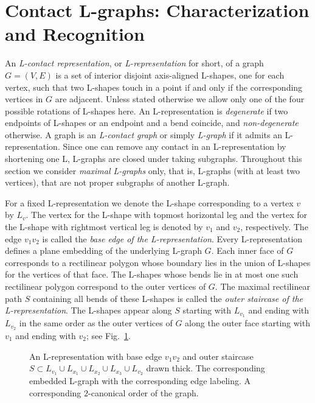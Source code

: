 \documentclass{llncs}
\begin{document}
\section{Contact L-graphs: Characterization and Recognition}\label{sec:characterization}

An \emph{L-contact representation}, or \emph{L-representation} for short, of a graph $G = (V,E)$ is a set of interior disjoint axis-aligned L-shapes, one for each vertex, such that two L-shapes touch in a point if and only if the corresponding vertices in $G$ are adjacent. Unless stated otherwise we allow only one of the four possible rotations of L-shapes here. An L-representation is \emph{degenerate} if two endpoints of L-shapes or an endpoint and a bend coincide, and \emph{non-degenerate} otherwise. A graph is an \emph{L-contact graph} or simply \emph{L-graph} if it admits an L-representation. Since one can remove any contact in an L-representation by shortening one L, L-graphs are closed under taking subgraphs. Throughout this section we consider \emph{maximal L-graphs} only, that is, L-graphs (with at least two vertices), that are not proper subgraphs of another L-graph.

For a fixed L-representation we denote the L-shape corresponding to a vertex $v$ by $L_v$. The vertex for the L-shape with topmost horizontal leg and the vertex for the L-shape with rightmost vertical leg is denoted by $v_1$ and $v_2$, respectively. The edge $v_1v_2$ is called the \emph{base edge of the L-representation}. Every L-representation defines a plane embedding of the underlying L-graph $G$. Each inner face of $G$ corresponds to a rectilinear polygon whose boundary lies in the union of L-shapes for the vertices of that face. 
The L-shapes whose bends lie in at most one such rectilinear polygon correspond to the outer vertices of $G$. The maximal rectilinear path $S$ containing all bends of these L-shapes is called the \emph{outer staircase of the L-representation}. The L-shapes appear along $S$ starting with $L_{v_1}$ and ending with $L_{v_2}$ in the same order as the outer vertices of $G$ along the outer face starting with $v_1$ and ending with $v_2$; see Fig.~\ref{fig:example}.



\begin{figure}[t!]
\centering
 \caption{ An L-representation with base edge $v_1v_2$ and outer staircase $S \subset L_{v_1} \cup L_{x_1} \cup L_{x_2} \cup L_{x_3} \cup L_{v_2}$ drawn thick.  The corresponding embedded L-graph with the corresponding edge labeling.  A corresponding $2$-canonical order of the graph.}
 \label{fig:example}
\end{figure}
\end{document}
